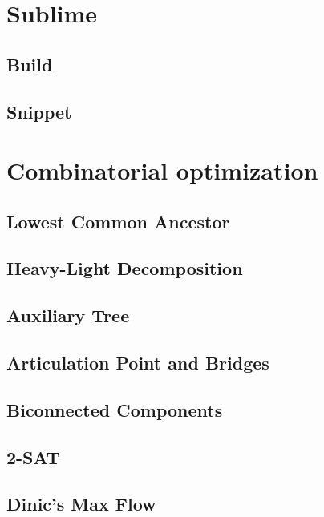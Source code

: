 \section{Sublime}
\subsection{	Build}
\raggedbottom
\hrulefill
\subsection{	Snippet}
\raggedbottom
\hrulefill

\section{Combinatorial optimization}
\subsection{Lowest Common Ancestor}
\raggedbottom
\hrulefill
\subsection{Heavy-Light Decomposition}
\raggedbottom
\hrulefill
\subsection{Auxiliary Tree}
\raggedbottom
\hrulefill
\subsection{Articulation Point and Bridges}
\raggedbottom
\hrulefill
\subsection{Biconnected Components}
\raggedbottom
\hrulefill
\subsection{	2-SAT}
\raggedbottom
\hrulefill
\subsection{Dinic's Max Flow}
\raggedbottom
\hrulefill
